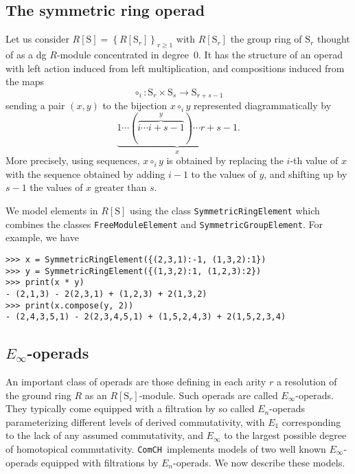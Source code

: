 \documentclass{amsart}
\renewcommand{\S}{\mathrm S}
\newcommand{\comch}{\texttt{ComCH}}
\begin{document}
\subsection{The symmetric ring operad}

Let us consider $R[\S] = \left\{R[\S_r]\right\}_{r \geq 1}$ with $R[\S_r]$ the group ring of $\S_r$ thought of as a dg $R$-module concentrated in degree~$0$. It has the structure of an operad with left action induced from left multiplication, and compositions induced from the maps
\begin{equation} \label{eq: compostion of permutations}
\circ_i \colon \S_r \times \S_s \to \S_{r+s-1}
\end{equation}
sending a pair $(x, y)$ to the bijection $x \circ_i y$ represented diagrammatically by
\begin{equation*}
\underbrace{1 \cdots (\overbrace{i \cdots i+s-1}^y) \cdots r+s-1}_x.
\end{equation*}
More precisely, using sequences, $x \circ_i y$ is obtained by replacing the $i$-th value of $x$ with the sequence obtained by adding $i-1$ to the values of $y$, and shifting up by $s-1$ the values of $x$ greater than $s$. 

We model elements in $R[\S]$ using the class \texttt{SymmetricRingElement} which combines the classes \texttt{FreeModuleElement} and \texttt{SymmetricGroupElement}. For example, we have
\begin{verbatim}
>>> x = SymmetricRingElement({(2,3,1):-1, (1,3,2):1})
>>> y = SymmetricRingElement({(1,3,2):1, (1,2,3):2})
>>> print(x * y)
- (2,1,3) - 2(2,3,1) + (1,2,3) + 2(1,3,2)
>>> print(x.compose(y, 2))
- (2,4,3,5,1) - 2(2,3,4,5,1) + (1,5,2,4,3) + 2(1,5,2,3,4)
\end{verbatim}

\subsection{$E_\infty$-operads}

An important class of operads are those defining in each arity $r$ a resolution of the ground ring $R$ as an $R[\S_r]$-module. Such operads are called \mbox{$E_\infty$-operads}. They typically come equipped with a filtration by so called $E_n$-operads parameterizing different levels of derived commutativity, with $E_1$ corresponding to the lack of any assumed commutativity, and $E_\infty$ to the largest possible degree of homotopical commutativity. \comch\, implements models of two well known $E_\infty$-operads equipped with filtrations by $E_n$-operads. We now describe these models.
\end{document}
